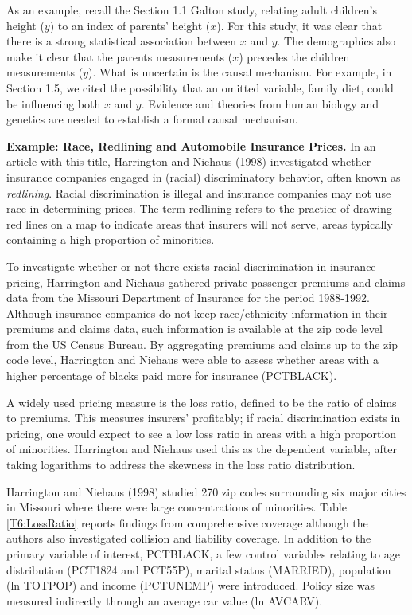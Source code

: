 As an example, recall the Section 1.1 Galton study, relating adult
children's height ($y$) to an index of parents' height ($x$). For
this study, it was clear that there is a strong statistical
association between $x$ and $y$. The demographics also make it clear
that the parents measurements ($x$) precedes the children
measurements ($y$). What is uncertain is the causal mechanism. For
example, in Section 1.5, we cited the possibility that an omitted
variable, family diet, could be influencing both $x$ and $y$.
Evidence and theories from human biology and genetics are needed to
establish a formal causal mechanism.

\linejed{}

\textbf{Example: Race, Redlining and Automobile Insurance Prices.}
In an article with this title, Harrington and Niehaus (1998)
investigated whether insurance companies engaged in (racial)
discriminatory behavior, often known as \emph{redlining}. Racial
discrimination is illegal and insurance companies may not use race
in determining prices. The term redlining refers to the practice of
drawing red lines on a map to indicate areas that insurers will not
serve, areas typically containing a high proportion of minorities.

To investigate whether or not there exists racial discrimination in
insurance pricing, Harrington and Niehaus gathered private passenger
premiums and claims data from the Missouri Department of Insurance
for the period 1988-1992. Although insurance companies do not keep
race/ethnicity information in their premiums and claims data, such
information is available at the zip code level from the US Census
Bureau. By aggregating premiums and claims up to the zip code level,
Harrington and Niehaus were able to assess whether areas with a
higher percentage of blacks paid more for insurance (PCTBLACK).

A widely used pricing measure is the loss ratio, defined to be the
ratio of claims to premiums. This measures insurers' profitably; if
racial discrimination exists in pricing, one would expect to see a
low loss ratio in areas with a high proportion of minorities.
Harrington and Niehaus used this as the dependent variable, after
taking logarithms to address the skewness in the loss ratio
distribution.

Harrington and Niehaus (1998) studied 270 zip codes surrounding six
major cities in Missouri where there were large concentrations of
minorities. Table \ref{T6:LossRatio} reports findings from
comprehensive coverage although the authors also investigated
collision and liability coverage. In addition to the primary
variable of interest, PCTBLACK, a few control variables relating to
age distribution (PCT1824 and PCT55P), marital status (MARRIED),
population (ln TOTPOP) and income (PCTUNEMP) were introduced. Policy
size was measured indirectly through an average car value (ln
AVCARV).

